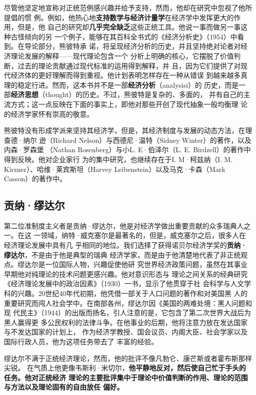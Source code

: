 尽管他坚定地宣称对正统范例感兴趣并给予支持，然而，他却在研究中忽视了他所提倡的惯
例。例如，他热心地\textbf{支持数学与经济计量学}在经济学中发挥更大的作用，但是，他
自己的研究却\textbf{几乎完全缺乏}这些正统工具。他说一事而做另一事这种古怪倾向的另
一个例子，能够在其百科全书式的《经济分析史》（1954）中看到。在导论部分，熊彼特承
诺，将呈现经济分析的历史，并且坚持绝对论者对经济理论发展的解释——现代理论包含一个
分析上明确的核心，它摆脱了价值判断，过去的理论贡献通过现代标准的运用得到解释，并
且，因为它们提供了对现代经济体的更好理解而得到重视。他计划表明怎样存在一种从错误
到越来越多真理的稳定行进。然而，这本书并不是一部\textbf{经济分析}（analysisi）的
历史，而是一部\textbf{经济思想}（thought）的历史。不过，熊彼特是复杂的、多面的，
并有自己的主流方式；这一点反映在下面的事实上，即他对那些开创了现代抽象一般均衡理
论的经济学家怀有崇高的敬意。

熊彼特没有形成学派来坚持其经济学，但是，其经济制度与发展的动态方法，在理查德·纳尔
逊（Richard Nelson）与西德尼·温特（Sidney Winter）的著作，以及内森·罗森堡
（Nathan Rosenberg）与小L. E·伯泽尔（L. E. Birdzell）的著作中得到反映。他对企业家行
为的集中研究，也继续存在于I. M·柯兹纳（I. M. Kirzner）、哈维·莱宾斯坦（Harvey
Leibenstein）以及马克·卡森（Mark Casson）的著作中。

\subsection{贡纳·缪达尔}

第二位准制度主义者是贡纳·缪达尔，他是对经济学做出重要贡献的众多瑞典人之一。在这
一领域，纳特·威克塞尔是最著名的，但是，威克塞尔之后，很多人在经济理论发展中具有几
乎相同的地位。我们选择了获得诺贝尔经济学奖的\textbf{贡纳·缪达尔}，不是由于他是典型的瑞典
经济学家，而是由于他清楚地代表了非正统观点。缪达尔是一位国际人物，兴趣促使他研
究世界经济政策问题，虽然在其事业早期他对纯理论的技术问题更感兴趣。他对意识形态与
理论之间关系的经典研究《经济理论发展中的政治因素》（1930）一书，显示了他贯穿于社
会科学与人文学科的兴趣。20世纪40年代初期，他凭借一部关于人口问题的著作和对美国黑
人的重要研究而闯人社会学中。在南部各州，缪达尔因《美国的两难处境：黑人问题和现
代民主》（1944）的出版而扬名，引人注意的是，它包含了第二次世界大战后为黑人赢得更
多公民权利的法律斗争。在他事业的后期，他将注意力放在发达国家与不发达国家的计划上，
作为经济学教授、国会议员、内阁大臣、社会学家以及国际行政人员，他为这项任务带去了
丰富的经验。

缪达尔不满于正统经济理论，然而，他的批评不像凡勃仑、康芒斯或者霍布斯那样尖锐。
在气质上他更像韦斯利·米切尔，\textbf{他平静地反对，然后使自己忙于手头的任务。他对正统经济
理论的主要批评集中于理论中价值判断的作用、理论的范围与方法以及理论固有的自由放任
偏好。}

